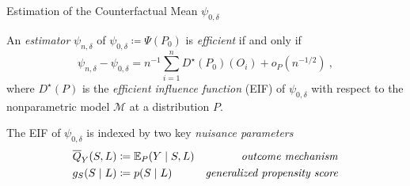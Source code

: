 \documentclass{beamer}
\begin{document}






\begin{frame}{Estimation of the Counterfactual Mean $\psi_{0,\delta}$}

An \textit{estimator} $\psi_{n,\delta}$ of $\psi_{0,\delta} \coloneqq \Psi(P_0)$
is \textit{efficient} if and only if
\[
  \psi_{n,\delta} - \psi_{0, \delta} = n^{-1} \sum\limits_{i=1}^n
  D^{\star}(P_0)(O_i) + o_P(n^{-1/2}) \ ,
\]
where $D^{\star}(P)$ is the \textit{efficient influence function} (EIF) of
$\psi_{0,\delta}$ with respect to the nonparametric model $\mathcal{M}$ at a
distribution $P$.
\vspace{0.25cm}

The EIF of $\psi_{0,\delta}$ is indexed by two key \textit{nuisance parameters}
\begin{align*}
  \overline{Q}_{Y}(S,L) &\coloneqq \mathbb{E}_{P}(Y \mid S, L) &
      \mbox{\textit{outcome mechanism}} \\
  g_{S}(S \mid L) &\coloneqq p(S \mid L) &
    \mbox{\textit{generalized propensity score}}
\end{align*}

\note{
}

\end{frame}
\end{document}
